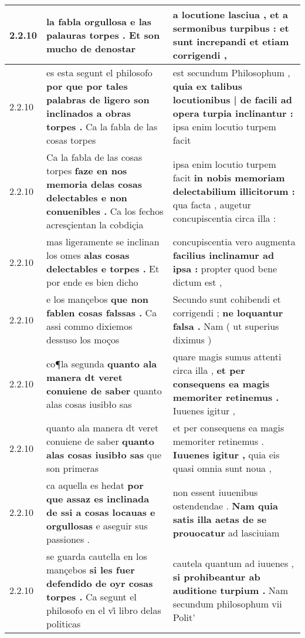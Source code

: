 \begin{tabular}{|p{1cm}|p{6.5cm}|p{6.5cm}|}
2.2.10 & la fabla orgullosa \textbf{ e las palauras torpes . } Et son mucho de denostar & a locutione lasciua , \textbf{ et a sermonibus turpibus : } et sunt increpandi et etiam corrigendi , \\\hline
2.2.10 & es esta segunt el philosofo \textbf{ por que por tales palabras de ligero son inclinados a obras torpes . } Ca la fabla de las cosas torpes & est secundum Philosophum , \textbf{ quia ex talibus locutionibus | de facili ad opera turpia inclinantur : } ipsa enim locutio turpem facit \\\hline
2.2.10 & Ca la fabla de las cosas torpes \textbf{ faze en nos memoria delas cosas delectables e non conuenibles . } Ca los fechos acresçientan la cobdiçia & ipsa enim locutio turpem facit \textbf{ in nobis memoriam delectabilium illicitorum : } qua facta , augetur concupiscentia circa illa : \\\hline
2.2.10 & mas ligeramente se inclinan los omes \textbf{ alas cosas delectables e torpes . } Et por ende es bien dicho & concupiscentia vero augmenta \textbf{ facilius inclinamur ad ipsa : } propter quod bene dictum est , \\\hline
2.2.10 & e los mançebos \textbf{ que non fablen cosas falssas . } Ca assi commo dixiemos dessuso los moços & Secundo sunt cohibendi et corrigendi ; \textbf{ ne loquantur falsa . } Nam ( ut superius diximus ) \\\hline
2.2.10 & co¶la segunda \textbf{ quanto ala manera dt veret conuiene de saber } quanto alas cosas iusibło sas & quare magis sumus attenti circa illa , \textbf{ et per consequens ea magis memoriter retinemus . } Iuuenes igitur , \\\hline
2.2.10 & quanto ala manera dt veret conuiene de saber \textbf{ quanto alas cosas iusibło sas } que son primeras & et per consequens ea magis memoriter retinemus . \textbf{ Iuuenes igitur , } quia eis quasi omnia sunt noua , \\\hline
2.2.10 & ca aquella es hedat \textbf{ por que assaz es inclinada de ssi a cosas locauas e orgullosas } e aseguir sus passiones . & non essent iuuenibus ostendendae . \textbf{ Nam quia satis illa aetas de se prouocatur } ad lasciuiam \\\hline
2.2.10 & se guarda cautella en los mançebos \textbf{ si les fuer defendido de oyr cosas torpes . } Ca segunt el philosofo en el vi̊ libro delas politicas & cautela quantum ad iuuenes , \textbf{ si prohibeantur ab auditione turpium . } Nam secundum philosophum vii Polit’ \\\hline

\end{tabular}
